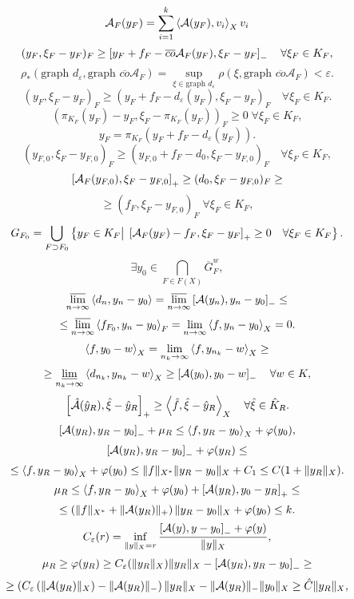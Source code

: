 \documentclass[12pt]{book} %
\let\epsilon\varepsilon
\begin{document}
\[\mathcal{A}_F(y_F)=\sum_{i=1}^k\mysca{\mathcal{A}(y_F)}{v_i}_Xv_i\]
\[(y_F,\xi_F-y_F)_F\geq\left[y_F+f_F-\overline{co}\mathcal{A}_F(y_F),\xi_F-y_F\right]_-\quad\forall\xi_F\in K_F,\]
\newcommand{\graph}{\mbox{graph }}
\[\rho_*(\graph d_\epsilon,\graph\overline{co}\mathcal{A}_F)=\sup_{\xi\in\graph d_\epsilon}\rho(\xi,\graph \overline{co}\mathcal{A}_F)<\epsilon.\]
\begin{equation}(y_F,\xi_F-y_F)_F\geq(y_F+f_F-d_\epsilon(y_F),\xi_F-y_F)_F\quad\forall\xi_F\in K_F.\end{equation}
\[(\pi_{K_F}(y_F)-y_F,\xi_F-\pi_{K_F}(y_F))_F\geq0\;\forall\xi_F\in K_F,\]
\[y_F=\pi_{K_F}(y_F+f_F-d_\epsilon(y_F)).\]
\[(y_{F,0},\xi_F-y_{F,0})_F\geq(y_{F,0}+f_F-d_0,\xi_F-y_{F,0})_F\quad\forall\xi_F\in K_F,\]
\[\left[\mathcal{A}_F(y_{F,0}),\xi_F-y_{F,0}\right]_+\geq(d_0,\xi_F-y_{F,0})_F\geq\]\[\geq(f_F,\xi_F-y_{F,0})_F\;\forall\xi_F\in K_F,\]
\[G_{F_0}=\bigcup_{F\supset F_0}\left\{y_F\in K_F\big|\;\left[\mathcal{A}_F(y_F)-f_F,\xi_F-y_F\right]_+\geq0\quad\forall\xi_F\in K_F\right\}.\]
\[\exists y_0\in\bigcap_{F\in F(X)}\overline{G}^w_F,\]
\[\varlimsup_{n\to\infty}\left<d_n,y_n-y_0\right>=\varlimsup_{n\to\infty}\left[\mathcal{A}(y_n),y_n-y_0\right]_-\leq\]
\[\leq\varlimsup_{n\to\infty}\mysca{f_{F_0}}
{y_n-y_0}_F=\lim_{n\to\infty}\mysca{f}{y_n-y_0}_X=0.\]
\[\mysca{f}{y_0-w}_X=\lim_{n_k\to\infty}\mysca{f}{y_{n_k}-w}_X\geq\]
\[\geq\varliminf_{n_k\to\infty}\left<d_{n_k},y_{n_k}-w\right>_X\geq\left[\mathcal{A}(y_0),y_0-w\right]_-\quad\forall w\in K,\]
\begin{equation}\left[\hat{\mathcal{A}}(\hat{y}_R),\hat{\xi}-\hat{y}_R\right]_+\geq\left<\hat{f},\hat{\xi}-\hat{y}_R\right>_X\quad\forall\hat{\xi}\in
	\hat{K}_R.\end{equation}
\begin{equation}\left[\mathcal{A}(y_R),y_R-y_0\right]_-+\mu_R\leq\left<f,y_R-y_0\right>_X+\varphi(y_0),\end{equation}
\[\left[\mathcal{A}(y_R),y_R-y_0\right]_-+\varphi(y_R)\leq\]
\[\leq\left<f,y_R-y_0\right>_X+\varphi(y_0)\leq\|f\|_{X^*}\|y_R-y_0\|_X+C_1\leq C(1+\|
y_R\|_X).\]
\[\mu_R\leq\left<f,y_R-y_0\right>_X+\varphi(y_0)+\left[\mathcal{A}(y_R),y_0-y_R\right]_+\leq\]
\[\leq\left(\|f\|_{X^*}+\|\mathcal{A}(y_R)\|_+\right)\|y_R-y_0
\|_X+\varphi(y_0)\leq k.\]
\[C_\epsilon(r)=\inf_{\mynorm{y}_X=r}\frac{\mysbra{\mathcal{A}(y),y-y_0}_-+\phi(y)}{\mynorm{y}_X},\]
\[\mu_R\geq\phi(y_R)\geq C_\epsilon(\mynorm{y_R}_X)\mynorm{y_R}_X-\mysbra{\mathcal{A}(y_R),y_R-y_0}_-\geq\]
\[\geq\mybra{C_\epsilon\mybra{\mynorm{\mathcal{A}
(y_R)}_X}-\mynorm{\mathcal{A}(y_R)}_-}\mynorm{y_R}_X-\mynorm{\mathcal{A}(y_R)}_-\mynorm{y_0}_X\geq\hat{C}\mynorm{y_R}_X,\]%
\end{document}
